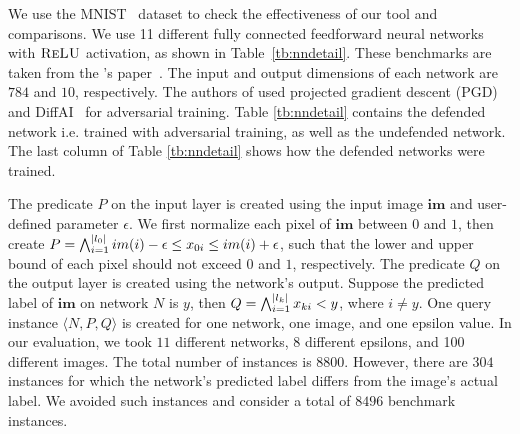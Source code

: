 We use the MNIST~\cite{deng2012mnist} dataset to check the effectiveness of our tool and comparisons. We use 11 different fully connected feedforward neural networks with $\textsc{ReLU}${} activation, as shown in Table~\ref{tb:nndetail}.
These benchmarks are taken from the \deeppoly{}'s paper~\cite{singh2019abstract}.  The input and output dimensions of each network are $784$ and $10$, respectively.  The authors of \deeppoly{} used projected gradient descent (PGD)~\cite{dong2018boosting}
and DiffAI~\cite{mirman2018differentiable} for adversarial training. Table \ref{tb:nndetail} contains the defended network i.e.
trained with adversarial training, as well as the undefended network. The last column of Table \ref{tb:nndetail} shows how the defended networks were trained.  

The predicate $P$ on the input layer is created using the input image $\boldsymbol{im}$ and user-defined 
parameter $\epsilon$.  We first normalize each pixel of $\boldsymbol{im}$ between $0$ and $1$, 
then create  $P = \bigwedge_{i=1}^{|l_0|} im(i)-\epsilon \leq x_{0i}\leq im(i)+\epsilon$, such that the lower and upper 
bound of each pixel should not exceed $0$ and $1$, respectively. 
The predicate $Q$ on the output layer is created using the network's output.     
Suppose the predicted label of $\boldsymbol{im}$ on network $N$ is $y$, then $Q = \bigwedge_{i=1}^{|l_k|} x_{ki} < y$, 
where $i \neq y$.  One query instance $\langle N,P,Q \rangle$ is created for one network, one image, and one epsilon 
value.  In our evaluation, we took $11$ different networks, 8 different epsilons, and 100 different images. 
The total number of instances is $8800$. However, there are $304$ instances for which the network's predicted label differs from the image's actual label. 
We avoided such instances and consider a total of $8496$ benchmark instances.    

